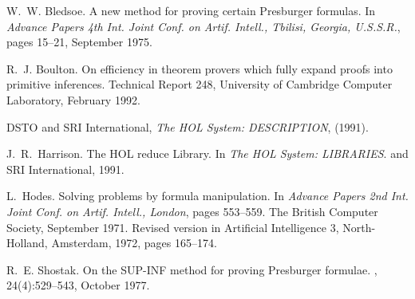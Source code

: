\begin{thebibliography}{99}

W.~W. Bledsoe.
\newblock A new method for proving certain {P}resburger formulas.
\newblock In {\em Advance Papers 4th Int. Joint Conf. on Artif. Intell.,
  Tbilisi, Georgia, U.S.S.R.}, pages 15--21, September 1975.

R.~J. Boulton.
\newblock On efficiency in theorem provers which fully expand proofs into
  primitive inferences.
\newblock Technical Report 248, University of Cambridge Computer Laboratory,
  February 1992.

{\small DSTO} and {\small SRI} International,
{\em The HOL System: DESCRIPTION}, (1991).

J.~R.~Harrison.
\newblock The HOL reduce Library.
\newblock In {\em The HOL System: LIBRARIES}.
 and {\small SRI} International, 1991.

L.~Hodes.
\newblock Solving problems by formula manipulation.
\newblock In {\em Advance Papers 2nd Int. Joint Conf. on Artif. Intell.,
  London}, pages 553--559. The British Computer Society, September 1971.
\newblock Revised version in Artificial Intelligence 3, North-Holland,
  Amsterdam, 1972, pages 165--174.

R.~E. Shostak.
\newblock On the {SUP-INF} method for proving {P}resburger formulae.
, 24(4):529--543, October 1977.

\end{thebibliography}


